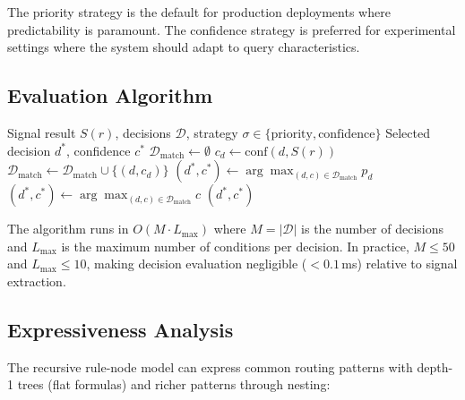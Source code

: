 The priority strategy is the default for production deployments where predictability is paramount.
The confidence strategy is preferred for experimental settings where the system should adapt to query characteristics.

\subsection{Evaluation Algorithm}

\begin{algorithm}[t]
\caption{Decision Evaluation}
\label{alg:decision_eval}
\begin{algorithmic}[1]
\REQUIRE Signal result $S(r)$, decisions $\mathcal{D}$, strategy $\sigma \in \{\text{priority}, \text{confidence}\}$
\ENSURE Selected decision $d^*$, confidence $c^*$
\STATE $\mathcal{D}_\text{match} \leftarrow \emptyset$
    \STATE $c_d \leftarrow \text{conf}(d, S(r))$
    \STATE $\mathcal{D}_\text{match} \leftarrow \mathcal{D}_\text{match} \cup \{(d, c_d)\}$
  \ENDIF
\ENDFOR
{}
  \STATE $(d^*, c^*) \leftarrow \arg\max_{(d, c) \in \mathcal{D}_\text{match}} p_d$
\ELSE
  \STATE $(d^*, c^*) \leftarrow \arg\max_{(d, c) \in \mathcal{D}_\text{match}} c$
\ENDIF
\RETURN $(d^*, c^*)$
\end{algorithmic}
\end{algorithm}

The algorithm runs in $O(M \cdot L_{\max})$ where $M = |\mathcal{D}|$ is the number of decisions and $L_{\max}$ is the maximum number of conditions per decision.
In practice, $M \leq 50$ and $L_{\max} \leq 10$, making decision evaluation negligible ($< 0.1$\,ms) relative to signal extraction.

\subsection{Expressiveness Analysis}

The recursive rule-node model can express common routing patterns with depth-1 trees (flat formulas) and richer patterns through nesting:

